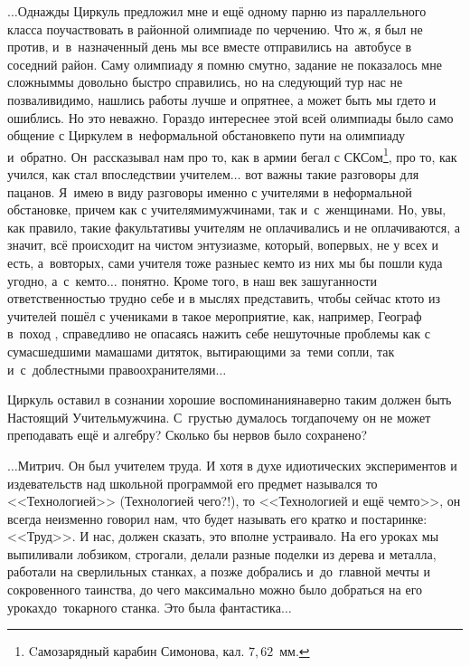 $\ldots$Однажды Циркуль предложил мне и ещё одному парню из параллельного класса поучаствовать в районной олимпиаде по черчению. Что ж, я был не против, и~в~назначенный день мы все вместе отправились на~автобусе в соседний район. Саму олимпиаду я помню смутно, задание не показалось мне сложным\mdash мы довольно быстро справились, но на следующий тур нас не позвали\mdash видимо, нашлись работы лучше и опрятнее, а может быть мы где\sdash то и ошиблись. Но это неважно. Гораздо интереснее этой всей олимпиады было само общение с Циркулем в~неформальной обстановке\mdash по пути на олимпиаду и~обратно. Он~рассказывал нам про то, как в армии бегал с СКС\sdash ом\footnote{Cамозарядный карабин Симонова, кал. $7,62$~мм.}, про то, как учился, как стал впоследствии учителем$\ldots$ вот важны такие разговоры для пацанов. Я~имею в виду разговоры именно с учителями в неформальной обстановке, причем как с учителями\sdash мужчинами, так и~с~женщинами. Но, увы, как правило, такие факультативы учителям не оплачивались и не оплачиваются, а значит, всё происходит на чистом энтузиазме, который, во\sdash первых, не у всех и есть, а~во\sdash вторых, сами учителя тоже разные\mdash с кем\sdash то из них мы бы пошли куда угодно, а~с~кем\sdash то$\ldots$ понятно. Кроме того, в наш век зашуганности ответственностью трудно себе и в мыслях представить, чтобы сейчас кто\sdash то из учителей пошёл с учениками в такое мероприятие, как, например, Географ в~поход \cite{ГеографГлобусПропил}, справедливо не опасаясь нажить себе нешуточные проблемы как с сумасшедшими мамашами дитяток, вытирающими за~теми сопли, так и~с~доблестными правоохранителями$\ldots$

Циркуль оставил в сознании хорошие воспоминания\mdash наверно таким должен быть Настоящий Учитель\sdash мужчина. С~грустью думалось тогда\mdash почему он не может преподавать ещё и алгебру? Сколько бы нервов было сохранено?
%
%
%
%
%



\vspace{1.0cm}
$\ldots$Митрич. Он был учителем труда. И хотя в духе идиотических экспериментов и издевательств над школьной программой его предмет назывался то <<Технологией>> (Технологией чего?!), то <<Технологией и ещё чем\sdash то>>, он всегда неизменно говорил нам, что будет называть его кратко и по\sdash старинке: <<Труд>>. И нас, должен сказать, это вполне устраивало. На его уроках мы выпиливали лобзиком, строгали, делали разные поделки из дерева и металла, работали на сверлильных станках, а позже добрались и~до~главной мечты и сокровенного таинства, до чего максимально можно было добраться на его уроках\mdash до~токарного станка. Это была фантастика$\ldots$

